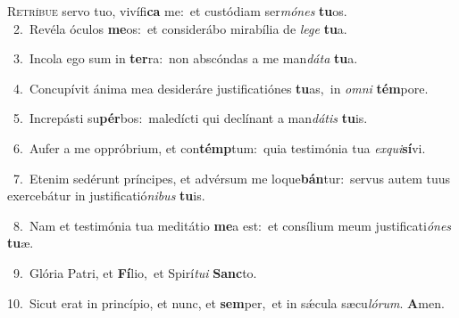 \lettrine{\initial\textcolor{\initialcolor}{R}}{etríbue} servo tuo, vivífi\textbf{ca} me:~\star et custódiam ser\-\textit{mó}\-\textit{nes} \textbf{tu}\-os.\\
{\numbfont\textcolor{\numbcolor}{~2.}}~Revéla óculos \textbf{me}\-os:~\star et considerábo mirabília de \textit{le}\-\textit{ge} \textbf{tu}\-a.\par
{\numbfont\textcolor{\numbcolor}{~3.}}~Incola ego sum in \textbf{ter}\-ra:~\star non abscóndas a me man\-\textit{dá}\-\textit{ta} \textbf{tu}\-a.\par
{\numbfont\textcolor{\numbcolor}{~4.}}~Concupívit ánima mea desideráre justificatiónes \textbf{tu}\-as,~\star in \textit{om}\-\textit{ni} \textbf{tém}\-pore.\par
{\numbfont\textcolor{\numbcolor}{~5.}}~Increpásti su\-\textbf{pér}\-bos:~\star maledícti qui declínant a man\-\textit{dá}\-\textit{tis} \textbf{tu}\-is.\par
{\numbfont\textcolor{\numbcolor}{~6.}}~Aufer a me oppróbrium, et con\-\textbf{témp}\-tum:~\star quia testimónia tua \textit{ex}\-\textit{qui}\textbf{sí}vi.\par
{\numbfont\textcolor{\numbcolor}{~7.}}~Etenim sedérunt príncipes, et advérsum me loque\-\textbf{bán}\-tur:~\star servus autem tuus exercebátur in justificatió\-\textit{ni}\-\textit{bus} \textbf{tu}\-is.\par
{\numbfont\textcolor{\numbcolor}{~8.}}~Nam et testimónia tua meditátio \textbf{me}\-a est:~\star et consílium meum justificati\-\textit{ó}\-\textit{nes} \textbf{tu}\-æ.\par
{\numbfont\textcolor{\numbcolor}{~9.}}~Glória Patri, et \textbf{Fí}\-lio,~\star et Spirí\-\textit{tu}\-\textit{i} \textbf{Sanc}\-to.\par
{\numbfont\textcolor{\numbcolor}{10.}}~Sicut erat in princípio, et nunc, et \textbf{sem}\-per,~\star et in sǽcula sæcu\-\textit{ló}\-\textit{rum}. \textbf{A}\-men.\par
